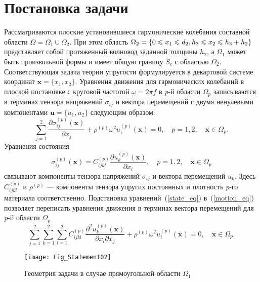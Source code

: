 \documentclass[press]{vestnik}
\begin{document}
\section{Постановка задачи}

Рассматриваются плоские установившиеся гармонические колебания составной области $\Omega = \Omega_1 \cup \Omega_2$. При этом область $\Omega_2 = \{0 \leqslant x_{1} \leqslant d_{2},  h_{3} \dm \leqslant x_{2}\leqslant h_{3}+h_{2}\} $ представляет собой протяженный волновод заданной толщины $h_{2}$, а $\Omega_{1}$ может быть произвольной формы и имеет общую границу $S_{c}$ с областью $\Omega_{2}$. Соответствующая задача теории упругости формулируется в декартовой системе координат $\bm{x} =\{x_1, x_2\}$. Уравнения движения для гармонических колебаний в плоской постановке с круговой частотой $\omega=2 \pi f$ в \textit{p}-й области $\Omega_{p}$ записываются в терминах тензора напряжений $\sigma_{ij}$ и вектора перемещений с двумя ненулевыми компонентами $\bm{u}=\{u_{1}, u_{2}\}$ следующим образом:
\begin{equation} \label{motion_eq}
	\sum_{j=1}^{2} \frac{\partial \sigma_{ij}^{(p)}(\bm{x})}{\partial x_{j}} + \rho^{(p)} \omega^{2} u_{i}^{(p)}(\bm{x})=0, \quad p=1,2, \quad \bm{x} \in \Omega_{p}.
\end{equation}
Уравнения состояния 
\begin{equation} \label{state_eq}
	\sigma_{ij}^{(p)}(\bm{x})=C_{ijkl}^{(p)} \frac{\partial u_{k}^{(p)}(\bm{x})}{\partial x_{l}}, \quad p=1,2, \quad \bm{x} \in \Omega_{p}
\end{equation}
связывают компоненты тензора напряжений $\sigma_{ij}$ и вектора перемещений $u_{k}$. Здесь $C_{ijkl}^{(p)}$ и $\rho^{(p)}$ --- компоненты тензора упругих постоянных и плотность \textit{p}-го материала соответственно. Подстановка уравнений~(\ref{state_eq}) в~(\ref{motion_eq}) позволяет переписать уравнения движения в терминах вектора перемещений для \textit{p}-й области $\Omega_{p}$
\begin{equation} \label{motion_eq_u}
	\sum_{j=1}^{2} \sum_{k=1}^{2} \sum_{l=1}^{2} C_{ijkl}^{(p)} \frac{\partial^{2} u_{k}^{(p)}(\bm{x})}{\partial x_{l} \partial x_{j}} + \rho^{(p)} \omega^{2} u_{i}^{(p)}(\bm{x})=0, \quad \bm{x} \in \Omega_{p}.
\end{equation}

\begin{figure}
	\begin{center}
		\texttt{[image: Fig\_Statement02]}
		\caption{Геометрия задачи в случае прямоугольной области $\Omega_{1}$} \label{Fig_Statement02}
	\end{center}
\end{figure}
\end{document}

